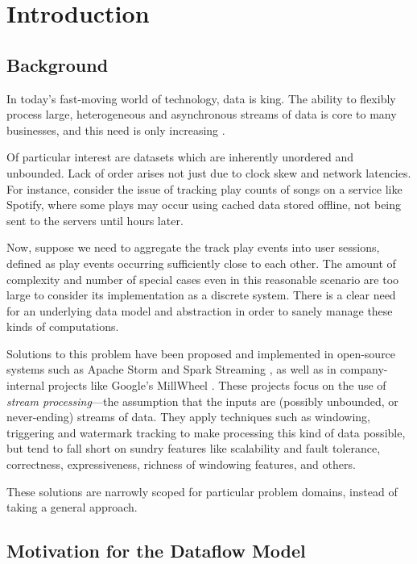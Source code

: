 \chapter{Introduction}\label{ch:intro}

\section{Background}\label{sec:intro:background}

In today's fast-moving world of technology, data is king.
The ability to flexibly process large, heterogeneous and asynchronous streams of data is core to many businesses, and this need is only increasing \cite{Yin_2015}\cite{mit_bean_variety}.

Of particular interest are datasets which are inherently unordered and unbounded.
Lack of order arises not just due to clock skew and network latencies.
For instance, consider the issue of tracking play counts of songs on a service like Spotify, where some plays may occur using cached data stored offline, not being sent to the servers until hours later.

Now, suppose we need to aggregate the track play events into user sessions, defined as play events occurring sufficiently close to each other.
The amount of complexity and number of special cases even in this reasonable scenario are too large to consider its implementation as a discrete system.
There is a clear need for an underlying data model and abstraction in order to sanely manage these kinds of computations.

Solutions to this problem have been proposed and implemented in open-source systems such as Apache Storm \cite{apache_storm} and Spark Streaming \cite{spark:zaharia2013discretized}, as well as in company-internal projects like Google's MillWheel \cite{akidau2013millwheel}.
These projects focus on the use of \emph{stream processing}---the assumption that the inputs are (possibly unbounded, or never-ending) streams of data.
They apply techniques such as windowing, triggering and watermark tracking to make processing this kind of data possible, but tend to fall short on sundry features like scalability and fault tolerance, correctness, expressiveness, richness of windowing features, and others.

These solutions are narrowly scoped for particular problem domains, instead of taking a general approach.

\section{Motivation for the Dataflow Model}\label{sec:intro:motivation}

